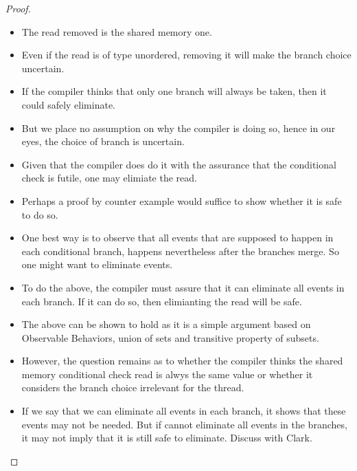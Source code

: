 \begin{proof}
        \begin{itemize}
            \item The read removed is the shared memory one.
            \item Even if the read is of type unordered, removing it will make the branch choice uncertain.
            \item If the compiler thinks that only one branch will always be taken, then it could safely eliminate. 
            \item But we place no assumption on why the compiler is doing so, hence in our eyes, the choice of branch is uncertain.
            \item Given that the compiler does do it with the assurance that the conditional check is futile, one may elimiate the read. 
            \item Perhaps a proof by counter example would suffice to show whether it is safe to do so. 
            \item One best way is to observe that all events that are supposed to happen in each conditional branch, happens nevertheless after the branches merge. So one might want to eliminate events. 
            \item To do the above, the compiler must assure that it can eliminate all events in each branch. If it can do so, then elimianting the read will be safe.
            \item The above can be shown to hold as it is a simple argument based on Observable Behaviors, union of sets and transitive property of subsets. 
            \item However, the question remains as to whether the compiler thinks the shared memory conditional check read is alwys the same value or whether it considers the branch choice irrelevant for the thread. 
            \item If we say that we can eliminate all events in each branch, it shows that these events may not be needed. But if cannot eliminate all events in the branches, it may not imply that it is still safe to eliminate. Discuss with Clark.
        \end{itemize}
    \end{proof}